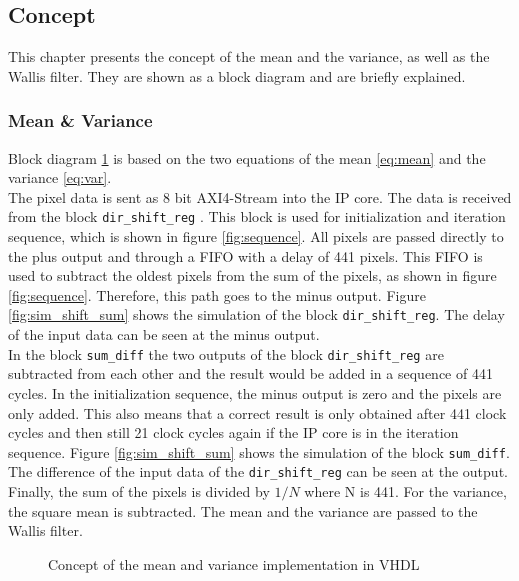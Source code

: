 \subsection{Concept} \label{ch:concept_vhdl}
This chapter presents the concept of the mean and the variance, as well as the Wallis filter. They are shown as a block diagram and are briefly explained.

\subsubsection*{Mean \& Variance}
Block diagram \ref{fig:mean_var_vhdl} is based on the two equations of the mean \ref{eq:mean} and the variance \ref{eq:var}. \\
The pixel data is sent as 8 bit AXI4-Stream into the IP core. The data is
received from the block \texttt{dir\_shift\_reg} . This block is used for
initialization and iteration sequence, which is shown in figure 
\ref{fig:sequence}. All pixels are passed directly to the plus output and
through a FIFO with a delay of 441 pixels. This FIFO is used to subtract the
oldest pixels from the sum of the pixels, as shown in figure \ref{fig:sequence}.
Therefore, this path goes to the minus output. Figure \ref{fig:sim_shift_sum}
shows the simulation of the block \texttt{dir\_shift\_reg}. The delay of the
input data can be seen at the minus output. \\
In the block \texttt{sum\_diff} the two outputs of the block 
\texttt{dir\_shift\_reg} are subtracted from each other and the result would be
added in a sequence of 441 cycles. In the initialization sequence, the minus output is zero and the pixels are only added. This also means that a correct result is only obtained after 441 clock cycles and then still 21 clock cycles again if the IP core is in the iteration sequence. Figure \ref{fig:sim_shift_sum} shows the simulation of the block \texttt{sum\_diff}. The difference of the input data of the \texttt{dir\_shift\_reg} can be seen at the output.\\
Finally, the sum of the pixels is divided by $1/N$ where N is 441. For the variance, the square mean is subtracted. The mean and the variance are passed to the Wallis filter.

\begin{figure}[tb!]
    \centering
    \begin{adjustbox}{max width=\textwidth, keepaspectratio}
        
    \end{adjustbox}
    \caption{Concept of the mean and variance implementation in VHDL}
    \label{fig:mean_var_vhdl}
\end{figure}

